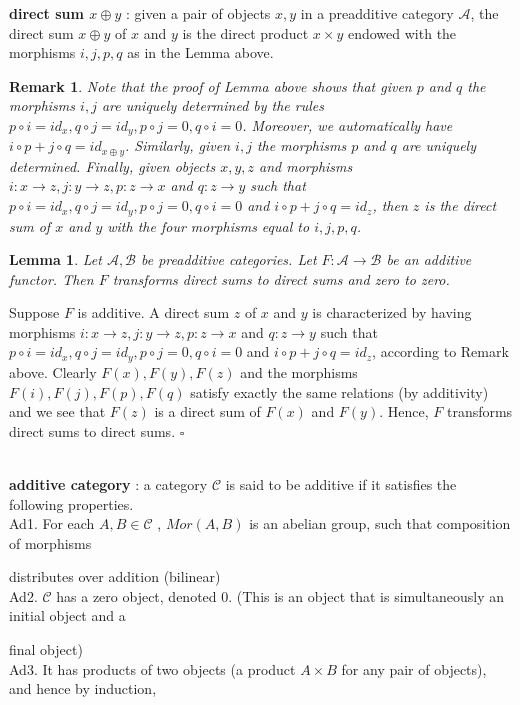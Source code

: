 \documentclass{article}
\newtheorem{lemma}[theorem]{Lemma}
\newtheorem{remark}[theorem]{Remark}
\newenvironment{Proof}{{\noindent \indent \it Proof:\quad}}{\hfill $\square$\par}
\begin{document}
\textbf{direct sum $x\oplus y$} : given a pair of objects $x,y$ in a preadditive category $\mathscr A$, the direct sum $x\oplus y$ of $x$ and $y$ is the direct product $x\times y$ endowed with the morphisms $i,j,p,q$ as in the Lemma above.
\begin{remark}
    Note that the proof of Lemma above shows that given $p$ and $q$ the morphisms $i, j$ are uniquely determined by the rules $p\circ i=id_x, q\circ j=id_y, p\circ j=0, q\circ i=0$. Moreover, we automatically have $i\circ p+j\circ q=id_{x\oplus y}$. Similarly, given $i, j$ the morphisms $p$ and $q$ are uniquely determined. Finally, given objects $x,y,z$ and morphisms $i:x\rightarrow z, j:y\rightarrow z, p:z\rightarrow x$ and $q:z\rightarrow y$ such that $p\circ i=id_x, q\circ j=id_y, p\circ j=0, q\circ i=0$ and $i\circ p+j\circ q=id_z$, then $z$ is the direct sum of $x$ and $y$ with the four morphisms equal to $i,j,p,q$.
\end{remark}
\begin{lemma}
    Let $\mathscr A,\mathscr B$ be preadditive categories. Let $F:\mathscr A \rightarrow \mathscr B$ be an additive functor. Then $F$ transforms direct sums to direct sums and zero to zero.
\end{lemma}
\begin{Proof}
    Suppose $F$ is additive. A direct sum $z$ of $x$ and $y$ is characterized by having morphisms $i:x\rightarrow z, j:y\rightarrow z, p:z\rightarrow x$ and $q:z\rightarrow y$ such that $p\circ i=id_x, q\circ j=id_y, p\circ j=0, q\circ i=0$ and $i\circ p+j\circ q=id_z$, according to Remark above. Clearly $F(x),F(y),F(z)$ and the morphisms $F(i),F(j),F(p),F(q)$ satisfy exactly the same relations (by additivity) and we see that $F(z)$ is a direct sum of $F(x)$ and $F(y)$. Hence, $F$ transforms direct sums to direct sums.
\end{Proof}
\\

\textbf{additive category} : a category $\mathscr C$ is said to be additive if it satisfies the following properties.
\\
Ad1. For each $A, B \in\mathscr C$ , $Mor(A, B)$ is an abelian group, such that composition
of morphisms 

distributes over addition (bilinear)
\\
Ad2. $\mathscr C$ has a zero object, denoted $0$. (This is an object that is simultaneously
an initial object and a 

final object)
\\
Ad3. It has products of two objects (a product $A \times B$ for any pair of objects),
and hence by induction, 
\end{document}
